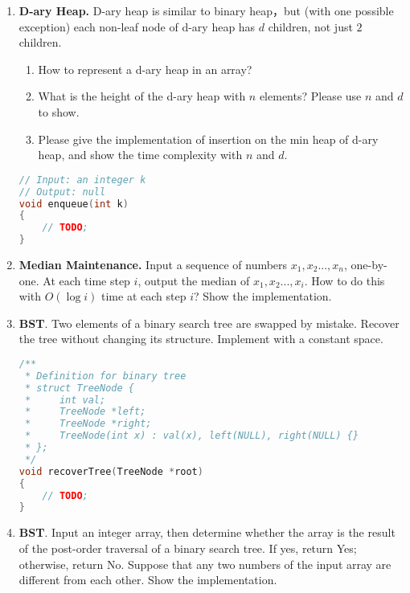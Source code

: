 \documentclass[12pt,a4paper]{article}
\makeatletter
\newtheorem*{solution}{Solution}
\theoremstyle{definition}
\renewenvironment{solution}[1][Solution] {\par\pushQED{\qed}\normalfont\topsep6\p@\@plus6\p@\relax\trivlist\item[\hskip\labelsep\bfseries#1\@addpunct{.}]\ignorespaces}{\popQED\endtrivlist\@endpefalse} \makeatother
\makeatother
\begin{document}
\begin{enumerate}

\item \textbf{D-ary Heap.} D-ary heap is similar to binary heap，but (with one possible exception) each non-leaf node of d-ary heap has $d$ children, not just $2$ children.

\begin{enumerate}
\item How to represent a d-ary heap in an array?
\item What is the height of the d-ary heap with $n$ elements? Please use $n$ and $d$ to show.
\item Please give the implementation of insertion on the min heap of d-ary heap, and show the time complexity with $n$ and $d$.
\end{enumerate}

\begin{lstlisting}[language=C++]
// Input: an integer k
// Output: null
void enqueue(int k)
{
	// TODO;
}
\end{lstlisting}


\item \textbf{Median Maintenance.} Input a sequence of numbers $x_1,x_2...,x_n$, one-by-one. At each time step $i$, output the median of $x_1,x_2...,x_i$. How to do this with $O(\log i)$ time at each step $i$? Show the implementation.

\item  \textbf{BST}. Two elements of a binary search tree are swapped by mistake. Recover the tree without changing its structure. Implement with a constant space.

\begin{lstlisting}[language=C++]
/**
 * Definition for binary tree
 * struct TreeNode {
 *     int val;
 *     TreeNode *left;
 *     TreeNode *right;
 *     TreeNode(int x) : val(x), left(NULL), right(NULL) {}
 * };
 */
void recoverTree(TreeNode *root)
{
	// TODO;
}
\end{lstlisting}


\item  \textbf{BST}. Input an integer array, then determine whether the array is the result of the post-order traversal of a binary search tree. If yes, return Yes; otherwise, return No. Suppose that any two numbers of the input array are different from each other. Show the implementation.


\end{enumerate}
\end{document}
